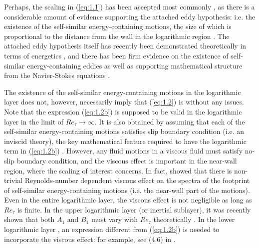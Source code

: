 \documentclass{jfm}
\begin{document}
Perhaps, the scaling in (\ref{eq:1.1}) has been accepted most commonly \cite[see also e.g.][]{Smits2021}, as there is a considerable amount of evidence supporting the attached eddy hypothesis: i.e. the existence of the self-similar energy-containing motions, the size of which is proportional to the distance from the wall in the logarithmic region \cite[see also the recent review by][]{Marusic2019}. The attached eddy hypothesis itself has recently been demonstrated theoretically in terms of energetics \cite[]{Hwang2020b}, and there has been firm evidence on the existence of self-similar energy-containing eddies \cite[e.g.][]{Tomkins2003,delAlamo2006b,Hwang2011,Lozano-Duran2014,Hwang2015,Hwang2016,Hellstrom2016,Hwang2018,Baars2020a,Baars2020b} as well as supporting mathematical structure from the Navier-Stokes equations \cite[e.g.][]{Hwang2010b,Klewicki2013,Moarref2013,McKeon2017,Eckhardt2018,Yang2019,Doohan2019}.

The existence of the self-similar energy-containing motions in the logarithmic layer does not, however, necessarily imply that (\ref{eq:1.2}) is without any issues. Note that the expression (\ref{eq:1.2b}) is supposed to be valid in the logarithmic layer in the limit of $Re_\tau \rightarrow \infty$. It is also obtained by assuming that each of the self-similar energy-containing motions satisfies slip boundary condition (i.e. an inviscid theory), the key mathematical feature required to have the logarithmic term in (\ref{eq:1.2b}) \cite[]{Townsend1976}. However, any fluid motions in a viscous fluid must satisfy no-slip boundary condition, and the viscous effect is important in the near-wall region, where the scaling of interest concerns. In fact, \cite{Hwang2016c} showed that there is non-trivial Reynolds-number dependent viscous effect on the spectra of the footprint of self-similar energy-containing motions (i.e. the near-wall part of the motions). Even in the entire logarithmic layer, the viscous effect is not negligible as long as $Re_\tau$ is finite. In the upper logarithmic layer (or inertial sublayer), it was recently shown that both $A_1$ and $B_1$ must vary with $Re_\tau$ theoretically \cite[]{Hwang2022}. In the lower logarithmic layer \cite[or mesolayer; see also][]{Afzal1982,Klewicki2013}, an expression different from (\ref{eq:1.2b}) is needed to incorporate the viscous effect: for example, see (4.6) in \cite{Hwang2022}.
\end{document}
